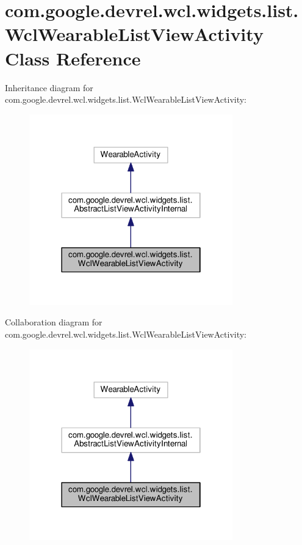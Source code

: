 \hypertarget{classcom_1_1google_1_1devrel_1_1wcl_1_1widgets_1_1list_1_1WclWearableListViewActivity}{}\section{com.\+google.\+devrel.\+wcl.\+widgets.\+list.\+Wcl\+Wearable\+List\+View\+Activity Class Reference}
\label{classcom_1_1google_1_1devrel_1_1wcl_1_1widgets_1_1list_1_1WclWearableListViewActivity}


Inheritance diagram for com.\+google.\+devrel.\+wcl.\+widgets.\+list.\+Wcl\+Wearable\+List\+View\+Activity\+:\nopagebreak
\begin{figure}[H]
\begin{center}
\leavevmode
\includegraphics[width=250pt]{d2/da7/classcom_1_1google_1_1devrel_1_1wcl_1_1widgets_1_1list_1_1WclWearableListViewActivity__inherit__graph}
\end{center}
\end{figure}


Collaboration diagram for com.\+google.\+devrel.\+wcl.\+widgets.\+list.\+Wcl\+Wearable\+List\+View\+Activity\+:\nopagebreak
\begin{figure}[H]
\begin{center}
\leavevmode
\includegraphics[width=250pt]{d5/d9a/classcom_1_1google_1_1devrel_1_1wcl_1_1widgets_1_1list_1_1WclWearableListViewActivity__coll__graph}
\end{center}
\end{figure}
